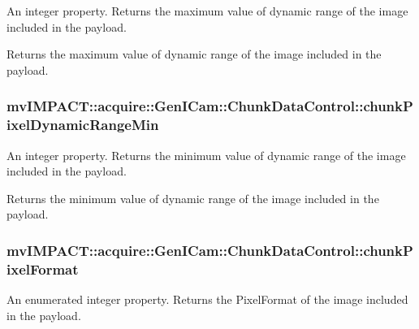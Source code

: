 An integer property. Returns the maximum value of dynamic range of the image included in the payload. 

Returns the maximum value of dynamic range of the image included in the payload. \hypertarget{classmv_i_m_p_a_c_t_1_1acquire_1_1_gen_i_cam_1_1_chunk_data_control_a5a9b1a979bd09b5a47ad56f5b178cb38}{
\subsubsection[{chunk\+Pixel\+Dynamic\+Range\+Min}]{ mv\+I\+M\+P\+A\+C\+T\+::acquire\+::\+Gen\+I\+Cam\+::\+Chunk\+Data\+Control\+::chunk\+Pixel\+Dynamic\+Range\+Min}}\label{classmv_i_m_p_a_c_t_1_1acquire_1_1_gen_i_cam_1_1_chunk_data_control_a5a9b1a979bd09b5a47ad56f5b178cb38}


An integer property. Returns the minimum value of dynamic range of the image included in the payload. 

Returns the minimum value of dynamic range of the image included in the payload. \hypertarget{classmv_i_m_p_a_c_t_1_1acquire_1_1_gen_i_cam_1_1_chunk_data_control_a9ece8017c9040ec2ffc9b180bd3c1abb}{
\subsubsection[{chunk\+Pixel\+Format}]{ mv\+I\+M\+P\+A\+C\+T\+::acquire\+::\+Gen\+I\+Cam\+::\+Chunk\+Data\+Control\+::chunk\+Pixel\+Format}}\label{classmv_i_m_p_a_c_t_1_1acquire_1_1_gen_i_cam_1_1_chunk_data_control_a9ece8017c9040ec2ffc9b180bd3c1abb}


An enumerated integer property. Returns the Pixel\+Format of the image included in the payload. 

